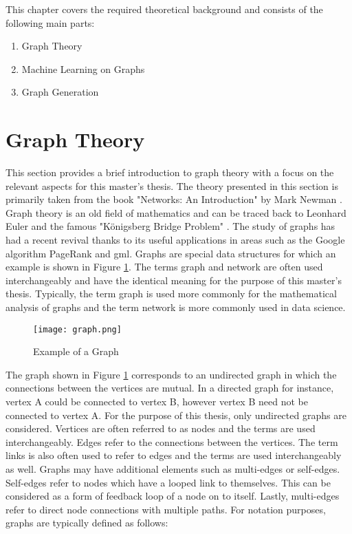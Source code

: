 
	This chapter covers the required theoretical background and consists 
	of the following main parts:

	\begin{enumerate}
		\item Graph Theory
		\item Machine Learning on Graphs
		\item Graph Generation
    \end{enumerate}

	\section{Graph Theory}

	This section provides a brief introduction to graph theory with a focus on
	the relevant aspects for this master's thesis. The theory presented in this
	section is primarily taken from the book "Networks: An Introduction" by 
	Mark Newman \citeyearpar{Newman2010}. \\

	\noindent Graph theory is an old field of mathematics and can be traced back 
	to Leonhard Euler and the famous "Königsberg Bridge Problem"
	\citep{euler1741solutio}. The study of graphs has had a recent revival
	thanks to its useful applications in areas such as the Google algorithm
	PageRank \citep{page1999pagerank} and \acs{gml}. Graphs are 
	special data structures for which an example is shown in Figure 
	\ref{fig:graph}. The terms graph and network are often used interchangeably 
	and have the identical meaning for the purpose of this master's thesis. 
	Typically, the term graph is used more commonly for the mathematical 
	analysis of graphs and the term network is more commonly used in data
	science.  

	\begin{figure}[h]
		\centering
		\texttt{[image: graph.png]}
		\caption{Example of a Graph}
		\cite[p. 111]{Newman2010}
		\label{fig:graph}
	\end{figure}
	
	\noindent The graph shown in Figure \ref{fig:graph} corresponds to an 
	undirected graph in which the connections between the vertices are mutual. 
	In a directed graph for instance, vertex A could be connected to vertex B, 
	however vertex B need not be connected to vertex A. For the purpose of this 
	thesis, only undirected graphs are considered. Vertices are often referred 
	to as nodes and the terms are used interchangeably. Edges refer to the
	connections between the vertices. The term links is also often used to
	refer to edges and the terms are used interchangeably as well. Graphs may have 
	additional elements such as multi-edges or self-edges. Self-edges refer to
	nodes which have a looped link to themselves. This can be considered as a
	form of feedback loop of a node on to itself. Lastly, multi-edges refer to 
	direct node connections with multiple paths. For notation purposes, graphs 
	are typically defined as follows:

